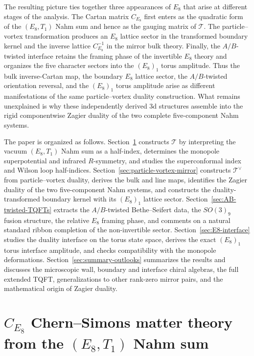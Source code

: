 \documentclass[11pt,a4paper]{article}
\numberwithin{equation}{section}
\begin{document}
The resulting picture ties together three appearances of $E_8$ that arise at different stages of the analysis.  The Cartan matrix $C_{E_8}$ first enters as the quadratic form of the $(E_8,T_1)$ Nahm sum and hence as the gauging matrix of $\mathcal T$.  The particle--vortex transformation produces an $E_8$ lattice sector in the transformed boundary kernel and the inverse lattice $C_{E_8}^{-1}$ in the mirror bulk theory.  Finally, the $A/B$-twisted interface retains the framing phase of the invertible $E_8$ theory and organizes the five character sectors into the $(E_8)_1$ torus amplitude.  Thus the bulk inverse-Cartan map, the boundary $E_8$ lattice sector, the $A/B$-twisted orientation reversal, and the $(E_8)_1$ torus amplitude arise as different manifestations of the same particle--vortex duality construction.  What remains unexplained is why these independently derived 3d structures assemble into the rigid componentwise Zagier duality of the two complete five-component Nahm systems.

The paper is organized as follows.  Section~\ref{sec:CE8-theory} constructs $\mathcal T$ by interpreting the vacuum $(E_8,T_1)$ Nahm sum as a half-index, determines the monopole superpotential and infrared $R$-symmetry, and studies the superconformal index and Wilson loop half-indices.  Section~\ref{sec:particle-vortex-mirror} constructs $\mathcal T^\vee$ from particle--vortex duality, derives the bulk and line maps, identifies the Zagier duality of the two five-component Nahm systems, and constructs the duality-transformed boundary kernel with its $(E_8)_1$ lattice sector.  Section~\ref{sec:AB-twisted-TQFTs} extracts the $A/B$-twisted Bethe--Seifert data, the $SO(3)_9$ fusion structure, the relative $E_8$ framing phase, and comments on a natural standard ribbon completion of the non-invertible sector.  Section~\ref{sec:E8-interface} studies the duality interface on the torus state space, derives the exact $(E_8)_1$ torus interface amplitude, and checks compatibility with the monopole deformations.  Section~\ref{sec:summary-outlooks} summarizes the results and discusses the microscopic wall, boundary and interface chiral algebras, the full extended TQFT, generalizations to other rank-zero mirror pairs, and the mathematical origin of Zagier duality.

\section{$C_{E_8}$ Chern--Simons matter theory from the $(E_8,T_1)$ Nahm sum}
\label{sec:CE8-theory}
\end{document}
